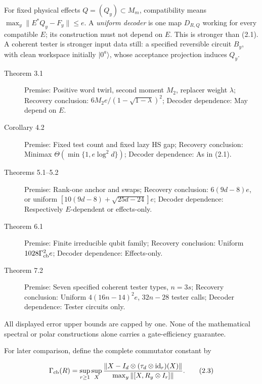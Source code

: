 \documentclass[11pt]{article}
\begin{document}
For fixed physical effects \(Q=(Q_y)\subset M_m\), compatibility means
\(\max_y\|E^*Q_y-F_y\|\le e\). A \emph{uniform decoder} is one map \(D_{R,Q}\)
working for every compatible \(E\); its construction must not depend on
\(E\). This is stronger than (2.1). A coherent tester is stronger input data
still: a specified reversible circuit \(B_y\), with clean workspace initially
\(|0^a\rangle\), whose acceptance projection induces \(Q_y\).

\begin{description}
\item[Theorem 3.1] Premise: Positive word twirl, second moment \(M_2\), replacer weight \(\lambda\); Recovery conclusion: \(6M_2e/(1-\sqrt{1-\lambda})^2\); Decoder dependence: May depend on \(E\).
\item[Corollary 4.2] Premise: Fixed test count and fixed lazy HS gap; Recovery conclusion: Minimax \(\Theta(\min\{1,e\log^2d\})\); Decoder dependence: As in (2.1).
\item[Theorems 5.1--5.2] Premise: Rank-one anchor and swaps; Recovery conclusion: \(6(9d-8)e\), or uniform \([10(9d-8)+\sqrt{25d-24}]e\); Decoder dependence: Respectively \(E\)-dependent or effects-only.
\item[Theorem 6.1] Premise: Finite irreducible qubit family; Recovery conclusion: Uniform \(1028\Gamma_{\rm cb}^2e\); Decoder dependence: Effects-only.
\item[Theorem 7.2] Premise: Seven specified coherent tester types, \(n=3s\); Recovery conclusion: Uniform \(4(16n-14)^2e\), \(32n-28\) tester calls; Decoder dependence: Tester circuits only.
\end{description}

All displayed error upper bounds are capped by one. None of the mathematical
spectral or polar constructions alone carries a gate-efficiency guarantee.

For later comparison, define the complete commutator constant by

\[
\Gamma_{\rm cb}(R)=\sup_{r\ge1}\sup_X
\frac{\|X-I_d\otimes(\tau_d\otimes\mathrm{id}_r)(X)\|}
{\max_y\|[X,R_y\otimes I_r]\|}.
\tag{2.3}
\]
\end{document}
